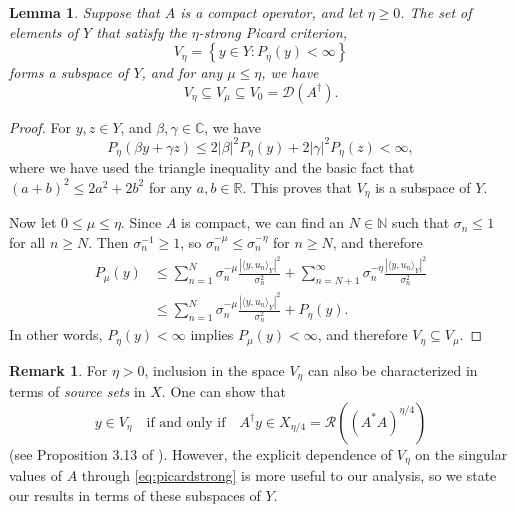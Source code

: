 \documentclass{article}
\newtheorem{lemma}[theorem]{Lemma}
\theoremstyle{definition}
\newtheorem{remark}[theorem]{Remark}
\newcommand{\N}{\mathbb{N}}
\newcommand{\R}{\mathbb{R}}
\newcommand{\C}{\mathbb{C}}
\newcommand{\abs}[1]{\left\lvert#1\right\rvert}
\newcommand{\domainsymb}{\mathcal{D}}
\newcommand{\rangesymb}{\mathcal{R}}
\newcommand{\domain}[1]{\domainsymb({#1})}
\newcommand{\range}[1]{\rangesymb({#1})}
\newcommand{\pseudoinv}[1]{{#1}^\dagger}
\begin{document}
\begin{lemma}
\label{thm:strongpicardnested}
    Suppose that \(A\) is a compact operator,
    and let \(\eta\geq 0\).
    The set of elements of \(Y\) that satisfy the \(\eta\)-strong Picard criterion,
    \begin{equation*}
        V_\eta = \left\{ y\in Y\colon P_\eta(y) < \infty \right\}
    \end{equation*}
    forms a subspace of \(Y\),
    and for any \(\mu\leq \eta\), we have
    \begin{equation*}
    V_\eta\subseteq V_\mu\subseteq V_0=\domain{\pseudoinv{A}}.
    \end{equation*}
\end{lemma}
\begin{proof}

For \(y,z\in Y\), and \(\beta,\gamma\in\C\), we have \
\begin{equation*}
P_\eta(\beta y+\gamma z)\leq 2\abs{\beta}^2P_\eta(y)+2\abs{\gamma}^2P_\eta(z) < \infty
,\end{equation*}
where we have used the triangle inequality and the basic fact that \((a+b)^2\leq 2a^2+2b^2\) for any \(a,b\in\R\). 
This proves that \(V_\eta\) is a subspace of \(Y\).

Now let \(0\leq \mu\leq \eta\).
Since \(A\) is compact, we can find an \(N\in\N\) such that \(\sigma_n\leq 1\) for all \(n\geq N\).
Then \(\sigma_n^{-1} \geq 1\), so \(\sigma_n^{-\mu} \leq \sigma_n^{-\eta}\) for \(n\geq N\),
and therefore
\begin{align*}
    P_\mu(y)
     & \leq
        \sum_{n=1}^N
        \sigma_n^{-\mu}\frac{\abs{\langle y, u_n \rangle_Y}^2}{
        \sigma_n^{2}
        }
        +
        \sum_{n=N+1}^\infty
        \sigma_n^{-\eta}\frac{\abs{\langle y, u_n \rangle_Y}^2}{
        \sigma_n^{2}
        }
    \\ & \leq
        \sum_{n=1}^N
        \sigma_n^{-\mu}\frac{\abs{\langle y, u_n \rangle_Y}^2}{
        \sigma_n^{2}
        }
        +
        P_\eta(y)
.\end{align*}
In other words, \(P_\eta(y)<\infty\) implies \(P_\mu(y)<\infty\),
and therefore \(V_\eta\subseteq V_\mu\).
\end{proof}


\begin{remark}
    For \(\eta>0\),
    inclusion in the space \(V_\eta\) can also be characterized in terms of
    \emph{source sets} in \(X\).
    One can show that
    \begin{equation*}
        y\in V_\eta
        \quad\text{if and only if}\quad 
        \pseudoinv{A}y \in X_{\eta/4}=\range{\left(A^*A\right)^{\eta/4}}
    \end{equation*}
    (see Proposition 3.13 of \cite{engl2000regularization}).
    However, the explicit dependence of \(V_\eta\) on the singular values of \(A\) through \eqref{eq:picardstrong} is more useful to our analysis, so we state our results in terms of these subspaces of \(Y\).
\end{remark}
\end{document}
